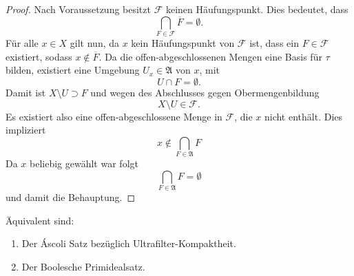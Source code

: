 \begin{proof}
  Nach Voraussetzung besitzt $\mathcal{F}$ keinen Häufungspunkt.
  Dies bedeutet, dass
  \begin{displaymath}
    \bigcap_{F \in \mathcal{F}} \overline F = \emptyset.
  \end{displaymath}
  Für alle $x \in X$ gilt nun, da $x$ kein Häufungspunkt von $\mathcal{F}$ ist, dass ein $F \in \mathcal{F}$ existiert, sodass $x \not\in \overline{F}$.
  Da die offen-abgeschlossenen Mengen eine Basis für $\tau$ bilden, existiert eine Umgebung $U_x \in \mathfrak{A}$ von $x$, mit 
  \begin{displaymath}
    U \cap F = \emptyset.
  \end{displaymath}
  Damit ist $X \setminus U \supset F$ und wegen des Abschlusses gegen Obermengenbildung
  \begin{displaymath}
    X \setminus U \in \mathcal{F}.
  \end{displaymath}
  Es existiert also eine offen-abgeschlossene Menge in $\mathcal{F}$, die $x$ nicht enthält. 
  Dies impliziert
  \begin{displaymath}
    x \not\in \bigcap_{F \in \mathfrak{A}} F
  \end{displaymath}
  Da $x$ beliebig gewählt war folgt 
  \begin{displaymath}
   \bigcap_{F \in \mathfrak{A}} F = \emptyset
  \end{displaymath}
  und damit die Behauptung.
\end{proof}

\begin{thm}
  Äquivalent sind:
  \begin{enumerate}
    \item Der Áscoli Satz bezüglich Ultrafilter-Kompaktheit.
    \item Der Boolesche Primidealsatz.
  \end{enumerate}
\end{thm}


